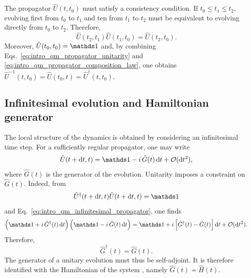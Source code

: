 The propagator $\hat U(t,t_0)$ must satisfy a consistency condition. If $t_0\leq t_1\leq t_2$, evolving first from $t_0$ to $t_1$ and ten from $t_1$ to $t_2$ must be equivalent to evolving directly from $t_0$ to $t_2$. Therefore,
\begin{equation}
	\hat U(t_2,t_1)\hat U(t_1,t_0)=\hat U(t_2,t_0).
	\label{eq:intro_qm_propagator_composition_law}
\end{equation}
Moreover, $\hat U(t_0,t_0)=\id$ and, by combining Eqs.~\eqref{eq:intro_qm_propagator_unitarity} and \eqref{eq:intro_qm_propagator_composition_law}, one obtains $\hat U^{-1}(t,t_0)=\hat U(t_0,t)=\hat U^\dagger(t,t_0)$.

\subsection{Infinitesimal evolution and Hamiltonian generator}

The local structure of the dynamics is obtained by considering an infinitesimal time step. For a sufficiently regular propagator, one may write
\begin{equation}
	\hat U(t+\mathrm{d}t,t)=\id-i\,\hat G(t)\,\mathrm{d}t+\mathcal{O}(\mathrm{d}t^2),
	\label{eq:intro_qm_infinitesimal_propagator}
\end{equation}
where $\hat G(t)$ is the generator of the evolution. Unitarity imposes a constraint on $\hat G(t)$. Indeed, from
\begin{equation}
	\hat U^\dagger(t+\mathrm{d}t,t)\hat U(t+\mathrm{d}t,t)=\id
	\label{eq:intro_qm_unitarity_infinitesimal_propagator}
\end{equation}
and Eq.~\eqref{eq:intro_qm_infinitesimal_propagator}, one finds
\begin{equation}
	\left(\id+i\,\hat G^\dagger(t)\,\mathrm{d}t\right)
	\left(\id-i\,\hat G(t)\,\mathrm{d}t\right)
	=
	\id+i\left[\hat G^\dagger(t)-\hat G(t)\right]\mathrm{d}t+\mathcal{O}(\mathrm{d}t^2).
	\label{eq:intro_qm_infinitesimal_unitarity_expansion}
\end{equation}
Therefore,
\begin{equation}
	\hat G^\dagger(t)=\hat G(t).
	\label{eq:intro_qm_generator_selfadjoint}
\end{equation}
The generator of a unitary evolution must thus be self-adjoint. It is therefore identified with the Hamiltonian of the system \cite{ReedSimon80}, namely $\hat G(t)=\hat H(t)$.

